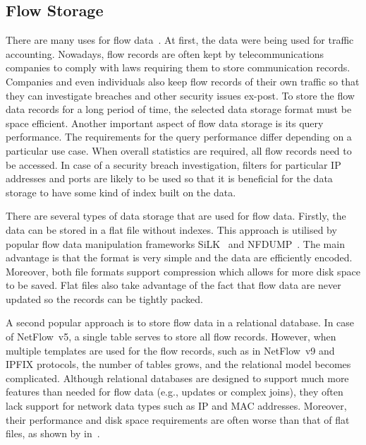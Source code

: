 \subsection{Flow Storage}\label{subsec:flow-storage}

There are many uses for flow data~\cite{Li-2013-Review, Umer-2017-Flow}. At first, the data were being used for traffic accounting. Nowadays, flow records are often kept by telecommunications companies to comply with laws requiring them to store communication records. Companies and even individuals also keep flow records of their own traffic so that they can investigate breaches and other security issues ex-post. To store the flow data records for a long period of time, the selected data storage format must be space efficient. Another important aspect of flow data storage is its query performance. The requirements for the query performance differ depending on a particular use case. When overall statistics are required, all flow records need to be accessed. In case of a security breach investigation, filters for particular IP addresses and ports are likely to be used so that it is beneficial for the data storage to have some kind of index built on the data.

There are several types of data storage that are used for flow data. Firstly, the data can be stored in a flat file without indexes. This approach is utilised by popular flow data manipulation frameworks SiLK~\cite{Shimeall-2014-Using} and NFDUMP~\cite{Haag-2014-NFDUMP}. The main advantage is that the format is very simple and the data are efficiently encoded. Moreover, both file formats support compression which allows for more disk space to be saved. Flat files also take advantage of the fact that flow data are never updated so the records can be tightly packed.

A second popular approach is to store flow data in a relational database. In case of NetFlow~v5, a single table serves to store all flow records. However, when multiple templates are used for the flow records, such as in NetFlow~v9 and IPFIX protocols, the number of tables grows, and the relational model becomes complicated. Although relational databases are designed to support much more features than needed for flow data (e.g., updates or complex joins), they often lack support for network data types such as IP and MAC addresses. Moreover, their performance and disk space requirements are often worse than that of flat files, as shown by \citeauthor{Hofstede-2010-Network} in~\cite{Hofstede-2010-Network}.

